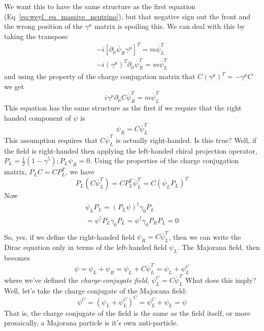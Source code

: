 We want this to have the same structure as the first equation (Eq~\ref{eq:weyl_eq_massive_neutrino}), but that negative sign out the front and the wrong position of the \(\gamma^\mu\) matrix is spoiling this. We can deal with this by taking the transpose
\begin{equation}
    \begin{gathered}
        - i [\partial _ \mu \overline {\psi}_R \gamma^\mu]^T = m \overline {\psi}_L ^T\\
        - i (\gamma^\mu)^T \partial _ \mu \overline {\psi}_R ^T = m \overline {\psi}_L ^T
    \end{gathered}
\end{equation}
and using the property of the charge conjugation matrix that \(C (\gamma^\mu)^T = - \gamma^\mu C\) we get
\begin{equation}
    i\gamma^\mu \partial_\mu C \overline {\psi}_R ^T = m \overline {\psi}_L ^T
\end{equation}
This equation has the same structure as the first if we require that the right handed component of \(\psi\) is
\begin{equation}
    \psi _R = C \overline {\psi}_L ^T
\end{equation}
This assumption requires that \(C \overline {\psi}_L ^T\) is actually right-handed. Is this true? Well, if the field is right-handed then applying the left-handed chiral projection operator, \(P_L = \frac{1}{2} (1 - \gamma^5); P_L\psi _R = 0\). Using the properties of the charge conjugation matrix, \(P_L C = C P_L ^T\), we have
\begin{equation}
    P_L (C \overline {\psi}_L ^T) = C P_L ^T  \overline {\psi}_L ^T = C (\overline {\psi}_L P_L)^T
\end{equation}
Now
\begin{equation}
    \begin{aligned}
        \overline {\psi}_L P_L = (P_L\psi)^\dagger \gamma_0 P_L\\
        = \psi ^\dagger P_L \gamma_0 P_L
        = \psi ^\dagger \gamma_0 P_R P_L= 0\\
    \end{aligned}
\end{equation}
So, yes, if we define the right-handed field \(\psi _R = C \overline {\psi}_L ^T\), then we can write the Dirac equation only in terms of the left-handed field \(\psi _L\). The Majorana field, then becomes
\begin{equation}
\psi = \psi _L + \psi _R = \psi _L + C \overline {\psi}_L^T = \psi _L + \psi _L ^C
\end{equation}
where we've defined the \textit{charge-conjugate field}, \(\psi _L ^C = C \overline {\psi}_L^T\)
What does this imply? Well, let's take the charge conjugate of the Majorana field:
\begin{equation}
    \psi ^C = (\psi _L + \psi _L ^C)^C = \psi _L ^C + \psi _L = \psi
\end{equation}
That is, the charge conjugate of the field is the same as the field itself, or more prosaically, a Majorana particle is it's own anti-particle.

